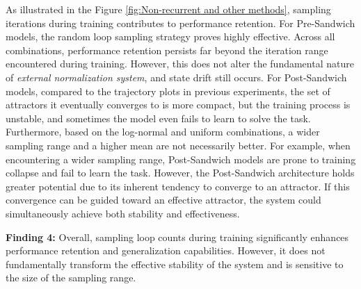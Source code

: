 As illustrated in the Figure \ref{fig:Non-recurrent and other methods}, sampling iterations during training contributes to performance retention. For Pre-Sandwich models, the random loop sampling strategy proves highly effective. Across all combinations, performance retention persists far beyond the iteration range encountered during training. However, this does not alter the fundamental nature of \textit{external normalization system}, and state drift still occurs. 
For Post-Sandwich models, compared to the trajectory plots in previous experiments, the set of attractors it eventually converges to is more compact, but the training process is unstable, and sometimes the model even fails to learn to solve the task. Furthermore, based on the log-normal and uniform combinations, a wider sampling range and a higher mean are not necessarily better. For example, when encountering a wider sampling range, Post-Sandwich models are prone to training collapse and fail to learn the task. However, the Post-Sandwich architecture holds greater potential due to its inherent tendency to converge to an attractor. If this convergence can be guided toward an effective attractor, the system could simultaneously achieve both stability and effectiveness.
\begin{findings}
    \textbf{Finding 4:} Overall, sampling loop counts during training significantly enhances performance retention and generalization capabilities. However, it does not fundamentally transform the effective stability of the system and is sensitive to the size of the sampling range.
\end{findings}


